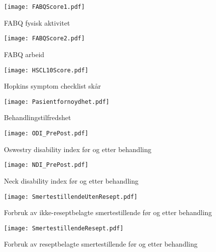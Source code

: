 \documentclass[norsk,a4paper]{article}\usepackage[]{graphicx}\usepackage[]{color}
\begin{document}
\clearpage

\begin{figure}[ht]
\centering
\texttt{[image: FABQScore1.pdf]}
\caption{FABQ fysisk aktivitet}
\end{figure}

\begin{figure}[ht]
\centering
\texttt{[image: FABQScore2.pdf]}
\caption{FABQ arbeid}
\end{figure}

\begin{figure}[ht]
\centering
\texttt{[image: HSCL10Score.pdf]}
\caption{Hopkins symptom checklist skår}
\end{figure}

\begin{figure}[ht]
\centering
\texttt{[image: Pasientfornoydhet.pdf]}
\caption{Behandlingstilfredshet}
\end{figure}

\begin{figure}[ht]
\centering
\texttt{[image: ODI\_PrePost.pdf]}
\caption{Oswestry disability index før og etter behandling}
\end{figure}

\begin{figure}[ht]
\centering
\texttt{[image: NDI\_PrePost.pdf]}
\caption{Neck disability index før og etter behandling}
\end{figure}

\begin{figure}[ht]
\centering
\texttt{[image: SmertestillendeUtenResept.pdf]}
\caption{Forbruk av ikke-reseptbelagte smertestillende før og etter behandling}
\end{figure}


\begin{figure}[ht]
\centering
\texttt{[image: SmertestillendeResept.pdf]}
\caption{Forbruk av reseptbelagte smertestillende før og etter behandling}
\end{figure}
\end{document}
